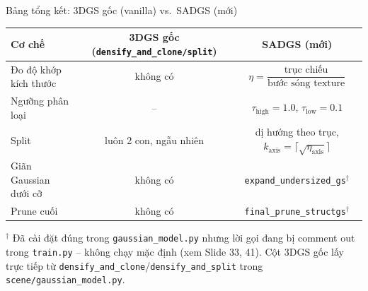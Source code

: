 
\begin{frame}{Bảng tổng kết: 3DGS gốc (vanilla) vs.\ SADGS (mới)}
\footnotesize
\begin{table}
\centering
\begin{tabular}{lcc}
\toprule
\textbf{Cơ chế} & \textbf{3DGS gốc (\texttt{densify\_and\_clone/split})} & \textbf{SADGS (mới)} \\
\midrule
Đo độ khớp kích thước & không có & $\eta = \dfrac{\text{trục chiếu}}{\text{bước sóng texture}}$ \\
Ngưỡng phân loại & -- & $\tau_{\text{high}}{=}1.0$, $\tau_{\text{low}}{=}0.1$ \\
Split & luôn 2 con, ngẫu nhiên & dị hướng theo trục, $k_{\text{axis}}{=}\lceil\sqrt{\eta_{\text{axis}}}\rceil$ \\
Giãn Gaussian dưới cỡ & không có & \texttt{expand\_undersized\_gs}$^\dagger$ \\
Prune cuối & không có & \texttt{final\_prune\_structgs}$^\dagger$ \\
\bottomrule
\end{tabular}
\end{table}
{\scriptsize $^\dagger$ Đã cài đặt đúng trong \texttt{gaussian\_model.py} nhưng lời gọi đang bị comment out trong \texttt{train.py} -- không chạy mặc định (xem Slide 33, 41). Cột 3DGS gốc lấy trực tiếp từ \texttt{densify\_and\_clone}/\texttt{densify\_and\_split} trong \texttt{scene/gaussian\_model.py}.}
\end{frame}
